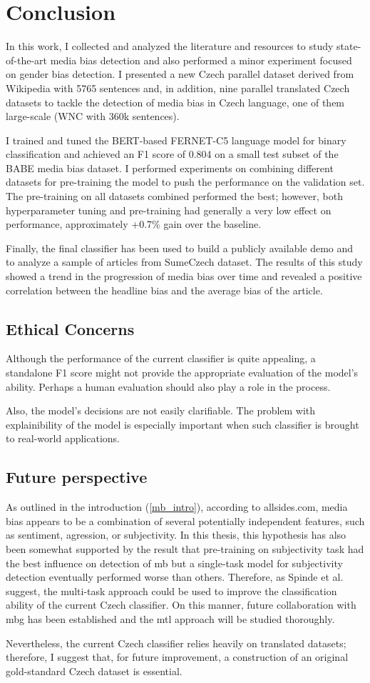 \chapter{Conclusion}
In this work, I collected and analyzed the literature and resources to study state-of-the-art media bias detection and also performed a minor experiment focused on gender bias detection. I presented a new Czech parallel dataset derived from Wikipedia with 5765 sentences and, in addition, nine parallel translated Czech datasets to tackle the detection of media bias in Czech language, one of them large-scale (WNC with 360k sentences).

I trained and tuned the BERT-based FERNET-C5 language model for binary classification and achieved an F1 score of 0.804 on a small test subset of the BABE media bias dataset. I performed experiments on combining different datasets for pre-training the model to push the performance on the validation set. The pre-training on all datasets combined performed the best; however, both hyperparameter tuning and pre-training had generally a very low effect on performance, approximately +0.7\% gain over the baseline. 

Finally, the final classifier has been used to build a publicly available demo and to analyze a sample of articles from SumeCzech dataset. The results of this study showed a trend in the progression of media bias over time and revealed a positive correlation between the headline bias and the average bias of the article.

\section{Ethical Concerns}
Although the performance of the current classifier is quite appealing, a standalone F1 score might not provide the appropriate evaluation of the model's ability. Perhaps a human evaluation should also play a role in the process.

Also, the model's decisions are not easily clarifiable. The problem with explainibility of the model is especially important when such classifier is brought to real-world applications. 


\section{Future perspective}
As outlined in the introduction (\ref{mb_intro}), according to allsides.com, media bias appears to be a combination of several potentially independent features, such as sentiment, agression, or subjectivity. In this thesis, this hypothesis has also been somewhat supported by the result that pre-training on subjectivity task had the best influence on detection of \gls{mb} but a single-task model for subjectivity detection eventually performed worse than others. Therefore, as Spinde et al. \cite{spindeexploiting} suggest, the multi-task approach could be used to improve the classification ability of the current Czech classifier. On this manner, future collaboration with \gls{mbg} has been established and the \gls{mtl} approach will be studied thoroughly.


Nevertheless, the current Czech classifier relies heavily on translated datasets; therefore, I suggest that, for future improvement, a construction of an original gold-standard Czech dataset is essential.
